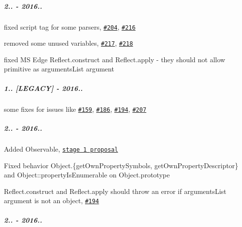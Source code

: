 \subparagraph*{2.. -\/ 2016..}


\begin{DoxyItemize}
\item fixed {\ttfamily script} tag for some parsers, \href{https://github.com/zloirock/core-js/issues/204}{\tt \#204}, \href{https://github.com/zloirock/core-js/issues/216}{\tt \#216}
\item removed some unused variables, \href{https://github.com/zloirock/core-js/issues/217}{\tt \#217}, \href{https://github.com/zloirock/core-js/issues/218}{\tt \#218}
\item fixed MS Edge {\ttfamily Reflect.\+construct} and {\ttfamily Reflect.\+apply} -\/ they should not allow primitive as {\ttfamily arguments\+List} argument
\end{DoxyItemize}

\subparagraph*{1.. \mbox{[}L\+E\+G\+A\+CY\mbox{]} -\/ 2016..}


\begin{DoxyItemize}
\item some fixes for issues like \href{https://github.com/zloirock/core-js/issues/159}{\tt \#159}, \href{https://github.com/zloirock/core-js/issues/186}{\tt \#186}, \href{https://github.com/zloirock/core-js/issues/194}{\tt \#194}, \href{https://github.com/zloirock/core-js/issues/207}{\tt \#207}
\end{DoxyItemize}

\subparagraph*{2.. -\/ 2016..}


\begin{DoxyItemize}
\item Added {\ttfamily Observable}, \href{https://github.com/zenparsing/es-observable}{\tt stage 1 proposal}
\item Fixed behavior {\ttfamily Object.\{get\+Own\+Property\+Symbols, get\+Own\+Property\+Descriptor\}} and {\ttfamily Object\+::property\+Is\+Enumerable} on {\ttfamily Object.\+prototype}
\item {\ttfamily Reflect.\+construct} and {\ttfamily Reflect.\+apply} should throw an error if {\ttfamily arguments\+List} argument is not an object, \href{https://github.com/zloirock/core-js/issues/194}{\tt \#194}
\end{DoxyItemize}

\subparagraph*{2.. -\/ 2016..}



